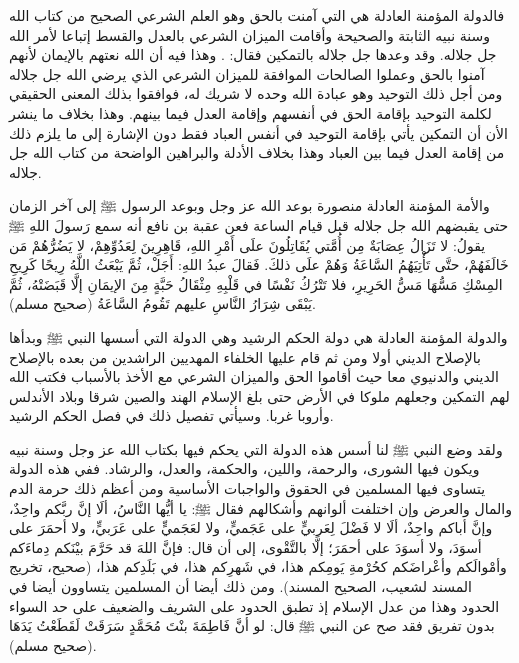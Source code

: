 فالدولة المؤمنة العادلة هي التي آمنت بالحق وهو العلم الشرعي الصحيح من كتاب الله وسنة نبيه الثابتة والصحيحة وأقامت الميزان الشرعي بالعدل والقسط إتباعا لأمر الله جل جلاله. وقد وعدها جل جلاله بالتمكين فقال: \quranayah*[24][55]{\footnotesize \surahname*[24]}. وهذا فيه أن الله نعتهم بالإيمان لأنهم آمنوا بالحق وعملوا الصالحات الموافقة للميزان الشرعي الذي يرضي الله جل جلاله ومن أجل ذلك التوحيد وهو عبادة الله وحده لا شريك له، فوافقوا بذلك المعنى الحقيقي لكلمة التوحيد بإقامة الحق في أنفسهم وإقامة العدل فيما بينهم. وهذا بخلاف ما ينشر الأن أن التمكين يأتي بإقامة التوحيد في أنفس العباد فقط دون الإشارة إلى ما يلزم ذلك من إقامة العدل فيما بين العباد وهذا بخلاف الأدلة والبراهين الواضحة من كتاب الله جل جلاله. 

والأمة المؤمنة العادلة منصورة بوعد الله عز وجل وبوعد الرسول ﷺ إلى آخر الزمان حتى يقبضهم الله جل جلاله قبل قيام الساعة فعن عقبة بن نافع أنه سمع رَسولَ اللهِ ﷺ يقولُ: لا تَزَالُ عِصَابَةٌ مِن أُمَّتي يُقَاتِلُونَ علَى أَمْرِ اللهِ، قَاهِرِينَ لِعَدُوِّهِمْ، لا يَضُرُّهُمْ مَن خَالَفَهُمْ، حتَّى تَأْتِيَهُمُ السَّاعَةُ وَهُمْ علَى ذلكَ. فَقالَ عبدُ اللهِ: أَجَلْ، ثُمَّ يَبْعَثُ اللَّهُ رِيحًا كَرِيحِ المِسْكِ مَسُّهَا مَسُّ الحَرِيرِ، فلا تَتْرُكُ نَفْسًا في قَلْبِهِ مِثْقَالُ حَبَّةٍ مِنَ الإيمَانِ إلَّا قَبَضَتْهُ، ثُمَّ يَبْقَى شِرَارُ  النَّاسِ عليهم تَقُومُ السَّاعَةُ {\footnotesize (صحيح مسلم)}.

والدولة المؤمنة العادلة هي دولة الحكم الرشيد وهي الدولة التي أسسها النبي ﷺ وبدأها بالإصلاح الديني أولا ومن ثم قام عليها الخلفاء المهديين الراشدين من بعده بالإصلاح الديني والدنيوي معا حيث أقاموا الحق والميزان الشرعي مع الأخذ بالأسباب فكتب الله لهم التمكين وجعلهم ملوكا في الأرض حتى بلغ الإسلام الهند والصين شرقا وبلاد الأندلس وأروبا غربا. وسيأتي تفصيل ذلك في فصل الحكم الرشيد.

ولقد وضع النبي ﷺ لنا أسس هذه الدولة التي يحكم فيها بكتاب الله عز وجل وسنة نبيه ويكون فيها الشورى، والرحمة، واللين، والحكمة، والعدل، والرشاد. ففي هذه الدولة  يتساوى فيها المسلمين في الحقوق والواجبات الأساسية ومن أعظم ذلك حرمة الدم والمال والعرض وإن اختلفت ألوانهم وأشكالهم فقال ﷺ: يا أيُّها النَّاسُ، ألَا إنَّ ربَّكم واحِدٌ، وإنَّ أباكم واحِدٌ، ألَا لا فَضْلَ لِعَربيٍّ على عَجَميٍّ، ولا لعَجَميٍّ على عَرَبيٍّ، ولا أحمَرَ على أسوَدَ، ولا أسوَدَ على أحمَرَ؛ إلَّا بالتَّقْوى، إلى أن قال: فإنَّ اللهَ قد حَرَّمَ بيْنَكم دِماءَكم وأمْوالَكم وأعْراضَكم كحُرْمةِ يَومِكم هذا، في شَهرِكم هذا، في بَلَدِكم هذا، {\footnotesize (صحيح، تخريج المسند لشعيب، الصحيح المسند)}. ومن ذلك أيضا أن المسلمين يتساوون أيضا في الحدود وهذا من عدل الإسلام إذ تطبق الحدود على الشريف والضعيف على حد السواء بدون تفريق فقد صح عن النبي ﷺ قال: لو أنَّ فَاطِمَةَ بنْتَ مُحَمَّدٍ سَرَقَتْ لَقَطَعْتُ يَدَهَا {\footnotesize (صحيح مسلم)}. 

